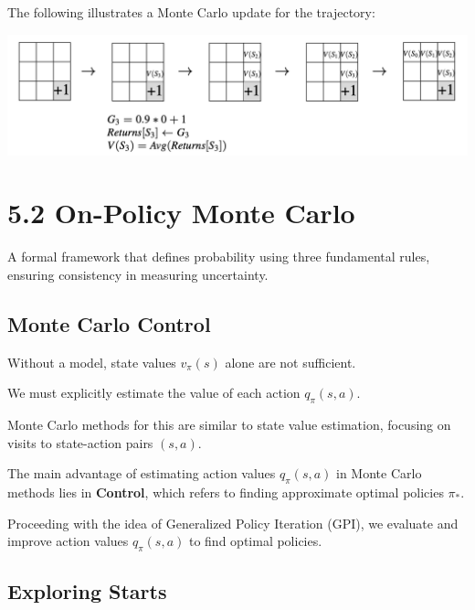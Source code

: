 \documentclass[
  letterpaper,
  DIV=11,
  numbers=noendperiod]{scrreprt}
\begin{document}
The following illustrates a Monte Carlo update for the trajectory:

\begin{center}
\includegraphics[width=0.65\linewidth,height=\textheight,keepaspectratio]{lecture5/images/MonteCarloUpdate.png}
\end{center}

\chapter{5.2 On-Policy Monte Carlo}\label{on-policy-monte-carlo}

\begin{tcolorbox}[enhanced jigsaw, colback=white, left=2mm, breakable, opacityback=0, bottomrule=.15mm, rightrule=.15mm, arc=.35mm, colframe=quarto-callout-note-color-frame, leftrule=.75mm, toprule=.15mm]

A formal framework that defines probability using three fundamental
rules, ensuring consistency in measuring uncertainty. 🎲

\end{tcolorbox}

\section{Monte Carlo Control}\label{monte-carlo-control}

Without a model, state values \(v_{\pi}(s)\) alone are not sufficient.

We must explicitly estimate the value of each action \(q_{\pi}(s,a)\).

Monte Carlo methods for this are similar to state value estimation,
focusing on visits to state-action pairs \((s,a)\).

The main advantage of estimating action values \(q_{\pi}(s,a)\) in Monte
Carlo methods lies in \textbf{Control}, which refers to finding
approximate optimal policies \(\pi_{*}\).

Proceeding with the idea of Generalized Policy Iteration (GPI), we
evaluate and improve action values \(q_{\pi}(s,a)\) to find optimal
policies.

\section{Exploring Starts}\label{exploring-starts}
\end{document}
